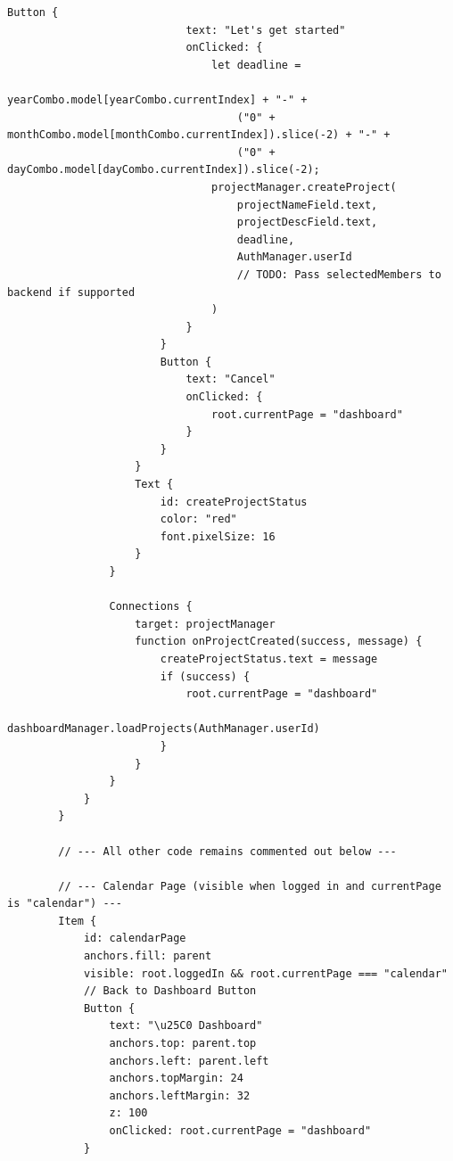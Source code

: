 \documentclass{report}
\begin{document}
\begin{lstlisting}[style=qmlstyle]
                        Button {
                            text: "Let's get started"
                            onClicked: {
                                let deadline =
                                    yearCombo.model[yearCombo.currentIndex] + "-" +
                                    ("0" + monthCombo.model[monthCombo.currentIndex]).slice(-2) + "-" +
                                    ("0" + dayCombo.model[dayCombo.currentIndex]).slice(-2);
                                projectManager.createProject(
                                    projectNameField.text,
                                    projectDescField.text,
                                    deadline,
                                    AuthManager.userId
                                    // TODO: Pass selectedMembers to backend if supported
                                )
                            }
                        }
                        Button {
                            text: "Cancel"
                            onClicked: {
                                root.currentPage = "dashboard"
                            }
                        }
                    }
                    Text {
                        id: createProjectStatus
                        color: "red"
                        font.pixelSize: 16
                    }
                }
    
                Connections {
                    target: projectManager
                    function onProjectCreated(success, message) {
                        createProjectStatus.text = message
                        if (success) {
                            root.currentPage = "dashboard"
                            dashboardManager.loadProjects(AuthManager.userId)
                        }
                    }
                }
            }
        }
    
        // --- All other code remains commented out below ---

        // --- Calendar Page (visible when logged in and currentPage is "calendar") ---
        Item {
            id: calendarPage
            anchors.fill: parent
            visible: root.loggedIn && root.currentPage === "calendar"
            // Back to Dashboard Button
            Button {
                text: "\u25C0 Dashboard"
                anchors.top: parent.top
                anchors.left: parent.left
                anchors.topMargin: 24
                anchors.leftMargin: 32
                z: 100
                onClicked: root.currentPage = "dashboard"
            }
        

\end{lstlisting}
\end{document}
